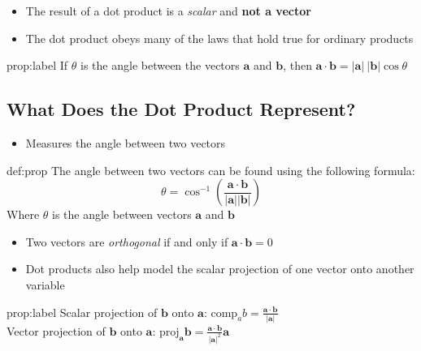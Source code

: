 \documentclass{package/notes}
\begin{document}
\begin{itemize}
	\item The result of a dot product is a \textit{scalar} and \textbf{not a vector}
	\item The dot product obeys many of the laws that hold true for ordinary products
\end{itemize}

\begin{proposition}{prop:label}
	If $\theta$ is the angle between the vectors $\mathbf a$ and $\mathbf b$, then $ \mathbf a \cdot \mathbf b = |\mathbf a|\:|\mathbf b |\cos\theta$
\end{proposition}


\subsection{What Does the Dot Product Represent?}

\begin{itemize}
	\item Measures the angle between two vectors
\end{itemize}

\begin{proposition}{def:prop}
	The angle between two vectors can be found using the following formula:
	$$\theta = \cos ^{-1}\left(\frac{\mathbf a \cdot \mathbf b}{|\mathbf a | |\mathbf b|}\right)$$
	Where $\theta$ is the angle between vectors $\mathbf{a}$ and $\mathbf{b}$
\end{proposition}

\begin{itemize}
	\item Two vectors are \textit{orthogonal} if and only if $\mathbf a \cdot \mathbf b = 0$ 
	\item Dot products also help model the scalar projection of one vector onto another variable
	\end{itemize}

\begin{proposition}{prop:label}
	Scalar projection of $\mathbf b$ onto $\mathbf a$: $\text{comp}_a b = \frac{\mathbf a \cdot \mathbf b}{|\mathbf a|}$ \\
	Vector projection of $\mathbf b$ onto $\mathbf a$: $\text{proj}_{\mathbf a}\mathbf b = \frac{\mathbf a \cdot \mathbf b}{|\mathbf a|^2}\mathbf a$
\end{proposition} %
\end{document}
